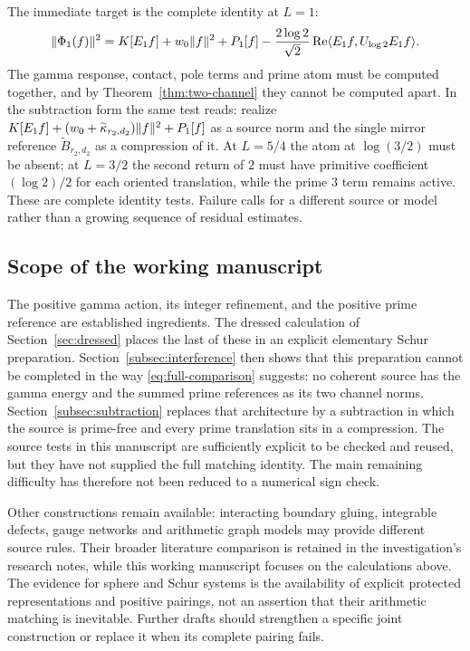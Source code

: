 The immediate target is the complete identity at $L=1$:
\begin{equation}\label{eq:first-target}
 \lVert \Phi_1(f)\rVert^2=K[E_1f]+w_0\lVert f\rVert^2+P_1[f]
 -\frac{2\log2}{\sqrt2}\operatorname{Re}\langle E_1f,U_{\log2}E_1f\rangle.
\end{equation}
The gamma response, contact, pole terms and prime atom must be computed
together, and by Theorem~\ref{thm:two-channel} they cannot be computed
apart. In the subtraction form the same test reads: realize
$K[E_1f]+(w_0+\widetilde\kappa_{r_2,d_2})\lVert f\rVert^2+P_1[f]$ as a source
norm and the single mirror reference $\widetilde B_{r_2,d_2}$ as a
compression of it. At $L=5/4$ the atom at $\log(3/2)$ must be absent; at $L=3/2$
the second return of $2$ must have primitive coefficient $(\log2)/2$
for each oriented translation, while the prime $3$ term remains active.
These are complete identity tests. Failure calls for a different source
or model rather than a growing sequence of residual estimates.

\subsection{Scope of the working manuscript}
The positive gamma action, its integer refinement, and the positive
prime reference are established ingredients. The dressed calculation of
Section~\ref{sec:dressed} places the last of these in an explicit elementary
Schur preparation. Section~\ref{subsec:interference} then shows that this
preparation cannot be completed in the way \eqref{eq:full-comparison}
suggests: no coherent source has the gamma energy and the summed prime
references as its two channel norms. Section~\ref{subsec:subtraction}
replaces that architecture by a subtraction in which the source is prime-free
and every prime translation sits in a compression. The source tests in this manuscript are
sufficiently explicit to be checked and reused, but they have not supplied
the full matching identity. The main remaining difficulty has therefore not
been reduced to a numerical sign check.

Other constructions remain available: interacting boundary gluing,
integrable defects, gauge networks and arithmetic graph models may
provide different source rules. Their broader literature comparison
is retained in the investigation's research notes, while this working
manuscript focuses on the calculations above. The evidence for sphere
and Schur systems is the availability of explicit protected
representations and positive pairings, not an assertion that their
arithmetic matching is inevitable. Further drafts should strengthen a
specific joint construction or replace it when its complete pairing fails.


